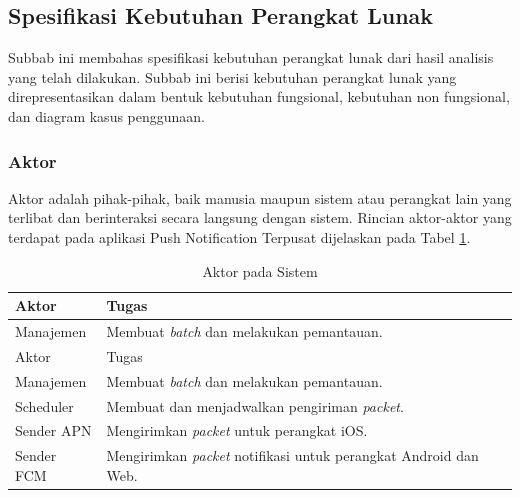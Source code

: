 \subsection{Spesifikasi Kebutuhan Perangkat Lunak}
\par Subbab ini membahas spesifikasi kebutuhan perangkat lunak dari hasil analisis yang telah dilakukan. Subbab ini berisi kebutuhan perangkat lunak yang direpresentasikan dalam bentuk kebutuhan fungsional, kebutuhan non fungsional, dan diagram kasus penggunaan.

\subsubsection{Aktor}
\par Aktor adalah pihak-pihak, baik manusia maupun sistem atau perangkat lain yang terlibat dan berinteraksi secara langsung dengan sistem. Rincian aktor-aktor yang terdapat pada aplikasi Push Notification Terpusat dijelaskan pada Tabel \ref{t:aktor}.
\begin{longtable}{|p{2cm}|p{7cm}|}
    \caption{Aktor pada Sistem} \label{t:aktor} \\ \hline
    \rowcolor{lightgray} Aktor & Tugas \\ \hline
    Manajemen & Membuat \textit{batch} dan melakukan pemantauan. \\ \hline
    \endfirsthead
    \hline
    \rowcolor{lightgray} Aktor & Tugas \\ \hline
    Manajemen & Membuat \textit{batch} dan melakukan pemantauan. \\ \hline
    \endhead
    Scheduler & Membuat dan menjadwalkan pengiriman \textit{packet}. \\ \hline
    Sender APN & Mengirimkan \textit{packet} untuk perangkat iOS. \\ \hline
    Sender FCM & Mengirimkan \textit{packet} notifikasi untuk perangkat Android dan Web. \\ \hline
\end{longtable}


